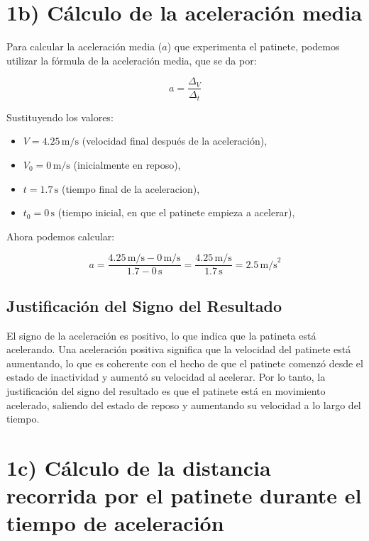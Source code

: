 \documentclass{article}
\begin{document}
\section*{1b) Cálculo de la aceleración media}

Para calcular la aceleración media (\(a\)) que experimenta el patinete, podemos utilizar la fórmula de la aceleración media, que se da por:

\[
a = \frac{\Delta_V}{\Delta_t}
\]

Sustituyendo los valores:

\begin{itemize}
    \item \(V = 4.25 \, \text{m/s}\) (velocidad final después de la aceleración),
    \item \(V_0 = 0 \, \text{m/s}\) (inicialmente en reposo),
    \item \(t = 1.7 \, \text{s}\) (tiempo final de la aceleracion),
    \item \(t_0 = 0 \, \text{s}\) (tiempo inicial, en que el patinete empieza a acelerar),

\end{itemize}

Ahora podemos calcular:

\[
a = \frac{4.25 \, \text{m/s} - 0 \, \text{m/s}}{1.7 - 0 \, \text{s}} = \frac{4.25 \, \text{m/s}}{1.7 \, \text{s}} = \boxed {2.5 \, \text{m/s}^2}
\]

\subsection*{Justificación del Signo del Resultado}

El signo de la aceleración es positivo, lo que indica que la patineta está acelerando. Una aceleración positiva significa que la velocidad del patinete está aumentando, lo que es coherente con el hecho de que el patinete comenzó desde el estado de inactividad y aumentó su velocidad al acelerar. Por lo tanto, la justificación del signo del resultado es que el patinete está en movimiento acelerado, saliendo del estado de reposo y aumentando su velocidad a lo largo del tiempo.


\section*{1c) Cálculo de la distancia recorrida por el patinete durante el tiempo de aceleración}
\end{document}
